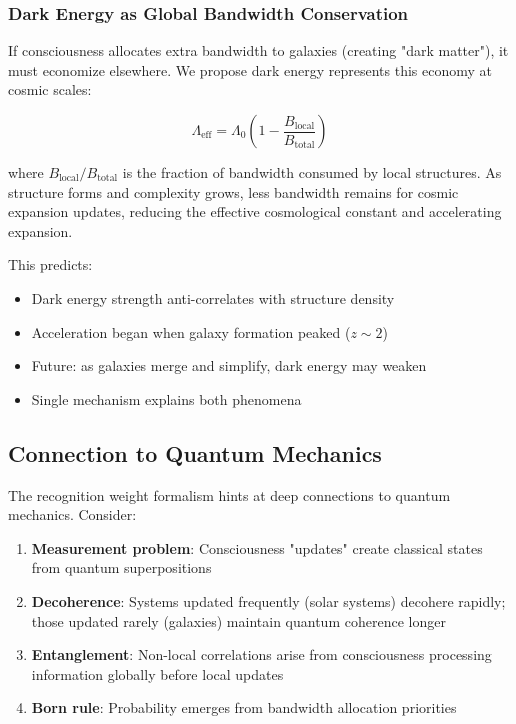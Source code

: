 \documentclass[twocolumn,prd,amsmath,amssymb,aps,superscriptaddress,nofootinbib]{revtex4-2}
\begin{document}
\subsubsection{Dark Energy as Global Bandwidth Conservation}

If consciousness allocates extra bandwidth to galaxies (creating "dark matter"), it must economize elsewhere. We propose dark energy represents this economy at cosmic scales:

\begin{equation}
\Lambda_{\text{eff}} = \Lambda_0 \left(1 - \frac{B_{\text{local}}}{B_{\text{total}}}\right)
\label{eq:dark_energy}
\end{equation}

where $B_{\text{local}}/B_{\text{total}}$ is the fraction of bandwidth consumed by local structures. As structure forms and complexity grows, less bandwidth remains for cosmic expansion updates, reducing the effective cosmological constant and accelerating expansion.

This predicts:
\begin{itemize}
\item Dark energy strength anti-correlates with structure density
\item Acceleration began when galaxy formation peaked ($z \sim 2$)
\item Future: as galaxies merge and simplify, dark energy may weaken
\item Single mechanism explains both phenomena
\end{itemize}

\subsection{Connection to Quantum Mechanics}

The recognition weight formalism hints at deep connections to quantum mechanics. Consider:

\begin{enumerate}
\item \textbf{Measurement problem}: Consciousness "updates" create classical states from quantum superpositions
\item \textbf{Decoherence}: Systems updated frequently (solar systems) decohere rapidly; those updated rarely (galaxies) maintain quantum coherence longer
\item \textbf{Entanglement}: Non-local correlations arise from consciousness processing information globally before local updates
\item \textbf{Born rule}: Probability emerges from bandwidth allocation priorities
\end{enumerate}
\end{document}
